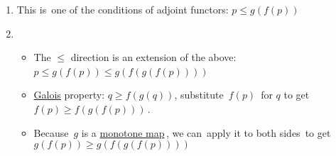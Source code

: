 \begin{enumerate}
    \item  This is \,one of the conditions of adjoint functors: $p \leq g(f(p))$\,
    \item \begin{itemize}
            \item The $\leq$ direction is an extension of the above: \,$p \leq g(f(p)) \leq g(f(g(f(p))))$\,
            \item \href{doc/1 math/Seven Sketches in Compositionality/Chapter 1: Generative Effects/6 Galois connections/1 Definition and examples/Galois connection}{Galois} property: $q  \geq f(g(q))$, substitute \,$f(p)$\, for $q$ to get \,$f(p) \geq f(g(f(p)))$\,.
            \item Because \,$g$ is a \href{doc/1 math/Seven Sketches in Compositionality/Chapter 1: Generative Effects/4 Monotone maps/1 Monotone map}{monotone map}\,, we can \,apply it to both sides\, to get $g(f(p)) \geq g(f(g(f(p))))$
          \end{itemize}
  \end{enumerate}